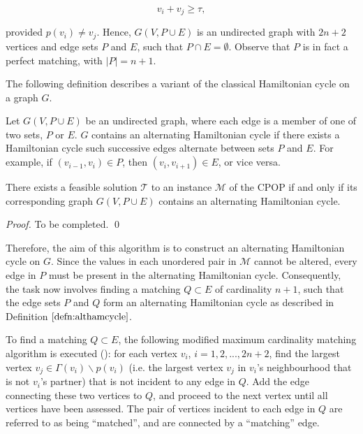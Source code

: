 \documentclass[oribibl]{llncs}
\begin{document}
\begin{equation}
	\label{eqn:jointsum}
	v_i + v_j \geq \tau,
\end{equation}

provided $p(v_i) \neq v_j$. Hence, $G(V, P \cup E)$ is an undirected graph with $2n + 2$ vertices and edge sets $P$ and $E$, such that $P \cap E = \emptyset$. Observe that $P$ is in fact a perfect matching, with $|P|= n+1$.

The following definition describes a variant of the classical Hamiltonian cycle on a graph $G$.

\begin{definition}
	\label{defn:althamcycle}
	Let $G(V, P\cup E)$ be an undirected graph, where each edge is a member of one of two sets, $P$ or $E$. $G$ contains an alternating Hamiltonian cycle if there exists a Hamiltonian cycle such successive edges alternate between sets $P$ and $E$. For example, if $(v_{i-1}, v_i) \in P$, then $(v_i, v_{i+1}) \in E$, or vice versa.
\end{definition}

\begin{theorem}
	\label{thm:cpopsoln}
	There exists a feasible solution $\mathcal{T}$ to an instance $\mathcal{M}$ of the CPOP if and only if its corresponding graph $G(V, P\cup E)$ contains an alternating Hamiltonian cycle.
\end{theorem}
\begin{proof}
	To be completed. \qed
\end{proof}

Therefore, the aim of this algorithm is to construct an alternating Hamiltonian cycle on $G$. Since the values in each unordered pair in $\mathcal{M}$ cannot be altered, every edge in $P$ must be present in the alternating Hamiltonian cycle. Consequently, the task now involves finding a matching $Q \subset E$ of cardinality $n+1$, such that the edge sets $P$ and $Q$ form an alternating Hamiltonian cycle as described in Definition $\ref{defn:althamcycle}$.  


To find a matching $Q \subset E$, the following modified maximum cardinality matching algorithm is executed (\citealp{mahadev1994, becker2010}): for each vertex $v_i$, $i = 1, 2,...,2n+2$, find the largest vertex $v_j \in \Gamma(v_i)\backslash p(v_i)$ (i.e. the largest vertex $v_j$ in $v_i$'s neighbourhood that is not $v_i$'s partner) that is not incident to any edge in $Q$. Add the edge connecting these two vertices to $Q$, and proceed to the next vertex until all vertices have been assessed. The pair of vertices incident to each edge in $Q$ are referred to as being ``matched'', and are connected by a ``matching'' edge. 
\end{document}
